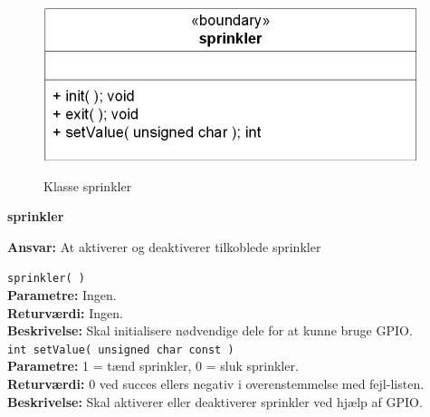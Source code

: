 \begin{figure}[htbp] \centering
{\includegraphics[scale=1.3]{filer/design/Klassediagrammer/sw_psoc_sprinkler}}
\caption{Klasse sprinkler}
\label{fig:sw_psoc_class_sprinkler}
\end{figure} 

{\centering
\textbf{sprinkler}\par
}
\textbf{Ansvar:} At aktiverer og deaktiverer tilkoblede sprinkler \

\verb+sprinkler( )+ \\
\textbf{Parametre:} Ingen. \\
\textbf{Returværdi:} Ingen. \\
\textbf{Beskrivelse:} Skal initialisere nødvendige dele for at kunne bruge GPIO.\\

\verb+int setValue( unsigned char const )+ \\
\textbf{Parametre:} 1 = tænd sprinkler, 0 = sluk sprinkler. \\
\textbf{Returværdi:} 0 ved succes ellers negativ i overenstemmelse med fejl-listen. \\
\textbf{Beskrivelse:} Skal aktiverer eller deaktiverer sprinkler ved hjælp af GPIO.\\